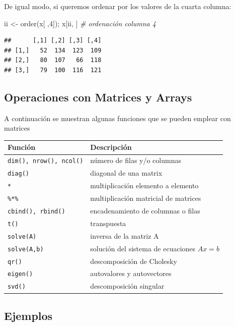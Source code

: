 \documentclass[
]{book}
\newenvironment{Shaded}{\begin{snugshade}}{\end{snugshade}}
\newcommand{\CommentTok}[1]{\textcolor[rgb]{0.56,0.35,0.01}{\textit{#1}}}
\newcommand{\DecValTok}[1]{\textcolor[rgb]{0.00,0.00,0.81}{#1}}
\newcommand{\FunctionTok}[1]{\textcolor[rgb]{0.00,0.00,0.00}{#1}}
\newcommand{\NormalTok}[1]{#1}
\newcommand{\OtherTok}[1]{\textcolor[rgb]{0.56,0.35,0.01}{#1}}
\theoremstyle{break}
\theoremstyle{nonumberplain}
\begin{document}
De igual modo, si queremos ordenar por los valores de la cuarta columna:

\begin{Shaded}
\begin{Highlighting}[]
\NormalTok{ii }\OtherTok{\textless{}{-}} \FunctionTok{order}\NormalTok{(x[ ,}\DecValTok{4}\NormalTok{]); x[ii, ]  }\CommentTok{\# ordenación columna 4}
\end{Highlighting}
\end{Shaded}

\begin{verbatim}
##      [,1] [,2] [,3] [,4]
## [1,]   52  134  123  109
## [2,]   80  107   66  118
## [3,]   79  100  116  121
\end{verbatim}

\hypertarget{operaciones-con-matrices-y-arrays}{%
\subsection{Operaciones con Matrices y Arrays}\label{operaciones-con-matrices-y-arrays}}

A continuación se muestran algunas funciones que se pueden emplear con
matrices

\begin{longtable}[]{@{}ll@{}}
\toprule
Función & Descripción \\
\midrule
\endhead
\texttt{dim(),\ nrow(),\ ncol()} & número de filas y/o columnas \\
\texttt{diag()} & diagonal de una matrix \\
\texttt{*} & multiplicación elemento a elemento \\
\texttt{\%*\%} & multiplicación matricial de matrices \\
\texttt{cbind(),\ rbind()} & encadenamiento de columnas o filas \\
\texttt{t()} & transpuesta \\
\texttt{solve(A)} & inversa de la matriz A \\
\texttt{solve(A,b)} & solución del sistema de ecuaciones \(Ax=b\) \\
\texttt{qr()} & descomposición de Cholesky \\
\texttt{eigen()} & autovalores y autovectores \\
\texttt{svd()} & descomposición singular \\
\bottomrule
\end{longtable}

\hypertarget{ejemplos}{%
\subsection{Ejemplos}\label{ejemplos}}
\end{document}
